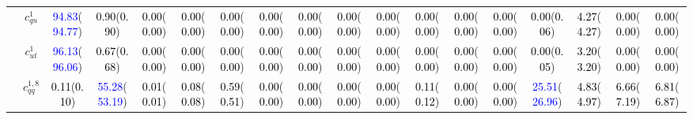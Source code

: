 \documentclass{article}
\begin{document}
\begin{landscape}
\begin{table}[H]
\begin{tabular}{|c|c|c|c|c|c|c|c|c|c|c|c|c|c|c|c|c|c|}
 & $c_{qu}^{1}$ & \textcolor{blue}{94.83}(\textcolor{blue}{94.77}) & \textcolor{black}{0.90}(\textcolor{black}{0.90}) & \textcolor{black}{0.00}(\textcolor{black}{0.00}) & \textcolor{black}{0.00}(\textcolor{black}{0.00}) & \textcolor{black}{0.00}(\textcolor{black}{0.00}) & \textcolor{black}{0.00}(\textcolor{black}{0.00}) & \textcolor{black}{0.00}(\textcolor{black}{0.00}) & \textcolor{black}{0.00}(\textcolor{black}{0.00}) & \textcolor{black}{0.00}(\textcolor{black}{0.00}) & \textcolor{black}{0.00}(\textcolor{black}{0.00}) & \textcolor{black}{0.00}(\textcolor{black}{0.00}) & \textcolor{black}{0.00}(\textcolor{black}{0.00}) & \textcolor{black}{0.00}(\textcolor{black}{0.06}) & \textcolor{black}{4.27}(\textcolor{black}{4.27}) & \textcolor{black}{0.00}(\textcolor{black}{0.00}) & \textcolor{black}{0.00}(\textcolor{black}{0.00})\\ \cline{2-18}
 & $c_{ut}^{1}$ & \textcolor{blue}{96.13}(\textcolor{blue}{96.06}) & \textcolor{black}{0.67}(\textcolor{black}{0.68}) & \textcolor{black}{0.00}(\textcolor{black}{0.00}) & \textcolor{black}{0.00}(\textcolor{black}{0.00}) & \textcolor{black}{0.00}(\textcolor{black}{0.00}) & \textcolor{black}{0.00}(\textcolor{black}{0.00}) & \textcolor{black}{0.00}(\textcolor{black}{0.00}) & \textcolor{black}{0.00}(\textcolor{black}{0.00}) & \textcolor{black}{0.00}(\textcolor{black}{0.00}) & \textcolor{black}{0.00}(\textcolor{black}{0.00}) & \textcolor{black}{0.00}(\textcolor{black}{0.00}) & \textcolor{black}{0.00}(\textcolor{black}{0.00}) & \textcolor{black}{0.00}(\textcolor{black}{0.05}) & \textcolor{black}{3.20}(\textcolor{black}{3.20}) & \textcolor{black}{0.00}(\textcolor{black}{0.00}) & \textcolor{black}{0.00}(\textcolor{black}{0.00})\\ \cline{2-18}
 & $c_{qq}^{1,8}$ & \textcolor{black}{0.11}(\textcolor{black}{0.10}) & \textcolor{blue}{55.28}(\textcolor{blue}{53.19}) & \textcolor{black}{0.01}(\textcolor{black}{0.01}) & \textcolor{black}{0.08}(\textcolor{black}{0.08}) & \textcolor{black}{0.59}(\textcolor{black}{0.51}) & \textcolor{black}{0.00}(\textcolor{black}{0.00}) & \textcolor{black}{0.00}(\textcolor{black}{0.00}) & \textcolor{black}{0.00}(\textcolor{black}{0.00}) & \textcolor{black}{0.00}(\textcolor{black}{0.00}) & \textcolor{black}{0.11}(\textcolor{black}{0.12}) & \textcolor{black}{0.00}(\textcolor{black}{0.00}) & \textcolor{black}{0.00}(\textcolor{black}{0.00}) & \textcolor{blue}{25.51}(\textcolor{blue}{26.96}) & \textcolor{black}{4.83}(\textcolor{black}{4.97}) & \textcolor{black}{6.66}(\textcolor{black}{7.19}) & \textcolor{black}{6.81}(\textcolor{black}{6.87})\\ \cline{2-18}

\end{tabular}
\end{table}
\end{landscape}
\end{document}

